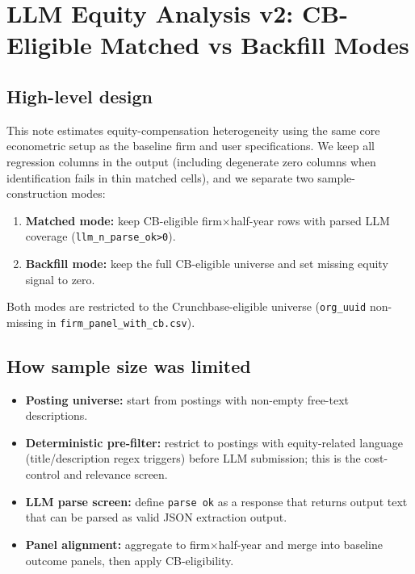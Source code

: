 \documentclass{article}
\begin{document}
\section*{LLM Equity Analysis v2: CB-Eligible Matched vs Backfill Modes}

\subsection*{High-level design}
This note estimates equity-compensation heterogeneity using the same core econometric setup as the baseline firm and user specifications. We keep all regression columns in the output (including degenerate zero columns when identification fails in thin matched cells), and we separate two sample-construction modes:
\begin{enumerate}
  \item \textbf{Matched mode:} keep CB-eligible firm$\times$half-year rows with parsed LLM coverage (\texttt{llm\_n\_parse\_ok>0}).
  \item \textbf{Backfill mode:} keep the full CB-eligible universe and set missing equity signal to zero.
\end{enumerate}
Both modes are restricted to the Crunchbase-eligible universe (\texttt{org\_uuid} non-missing in \texttt{firm\_panel\_with\_cb.csv}).

\subsection*{How sample size was limited}
\begin{itemize}
  \item \textbf{Posting universe:} start from postings with non-empty free-text descriptions.
  \item \textbf{Deterministic pre-filter:} restrict to postings with equity-related language (title/description regex triggers) before LLM submission; this is the cost-control and relevance screen.
  \item \textbf{LLM parse screen:} define \texttt{parse ok} as a response that returns output text that can be parsed as valid JSON extraction output.
  \item \textbf{Panel alignment:} aggregate to firm$\times$half-year and merge into baseline outcome panels, then apply CB-eligibility.
\end{itemize}
\end{document}
